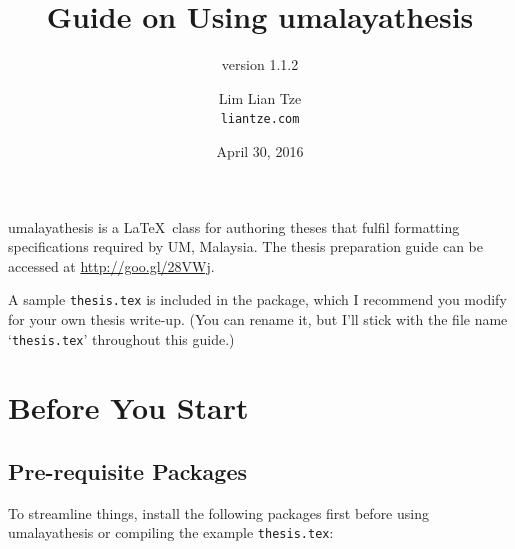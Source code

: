 \documentclass[a4paper,12pt]{scrartcl}
\title{Guide on Using umalayathesis}
\subtitle{version 1.1.2}
\author{Lim Lian Tze\\\texttt{\smaller liantze\string@gmail.com}}
\date{\smaller April 30, 2016}
\begin{document}
\maketitle

%

%
%

\textsf{umalayathesis} is a \LaTeX\ class for authoring theses that fulfil formatting specifications required by \gls{UM}, Malaysia. The thesis preparation guide can be accessed at \url{http://goo.gl/28VWj}. 

A sample \texttt{thesis.tex} is included in the package, which I recommend you modify for your own thesis write-up. (You can rename it, but I'll stick with the file name `\texttt{thesis.tex}' throughout this guide.)

\section{Before You Start}
\subsection{Pre-requisite Packages}
To streamline things, install the following packages first before using \textsf{umalayathesis} or compiling the example \texttt{thesis.tex}:
\end{document}
